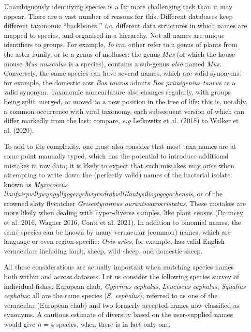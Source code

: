 \documentclass[10pt,oneside]{article}
\begin{document}
Unambiguously identifying species is a far more challenging task than it
may appear. There are a vast number of reasons for this. Different
databases keep different taxonomic ``backbones,'' \emph{i.e.} different
data structures in which names are mapped to species, and organised in a
hierarchy. Not all names are unique identifiers to groups. For example,
\emph{Io} can either refer to a genus of plants from the aster family,
or to a genus of molluscs; the genus \emph{Mus} (of which the house
mouse \emph{Mus musculus} is a species), contains a sub-genus
\emph{also} named \emph{Mus}. Conversely, the same species can have
several names, which are valid synonyms: for example, the domestic cow
\emph{Bos taurus} admits \emph{Bos primigenius taurus} as a valid
synonym. Taxonomic nomenclature also changes regularly, with groups
being split, merged, or moved to a new position in the tree of life;
this is, notably, a common occurrence with viral taxonomy, each
subsequent version of which can differ markedly from the last; compare,
\emph{e.g} Lefkowitz et al. (2018) to Walker et al. (2020).

To add to the complexity, one must also consider that most taxa names
are at some point manually typed, which has the potential to introduce
additional mistakes in raw data; it is likely to expect that such
mistakes may arise when attempting to write down the (perfectly valid)
names of the bacterial isolate known as \emph{Myxococcus
llanfairpwllgwyngyllgogerychwyrndrobwllllantysiliogogogochensis}, or of
the crowned slaty flycatcher \emph{Griseotyrannus
aurantioatrocristatus}. These mistakes are more likely when dealing with
hyper-diverse samples, like plant census (Dauncey et al. 2016, Wagner
2016, Conti et al. 2021). In addition to binomial names, the same
species can be known by many vernacular (common) names, which are
language or even region-specific: \emph{Ovis aries}, for example, has
valid English vernaculars including lamb, sheep, wild sheep, and
domestic sheep.

All these considerations are actually important when matching species
names both within and across datasets. Let us consider the following
species survey of individual fishes, European chub, \emph{Cyprinus
cephalus}, \emph{Leuciscus cephalus}, \emph{Squalius cephalus}: all are
the same species (\emph{S. cephalus}), referred to as one of the
vernacular (European chub) and two formerly accepted names now
classified as synonyms. A cautious estimate of diversity based on the
user-supplied names would give \(n=4\) species, when there is in fact
only one.
\end{document}
